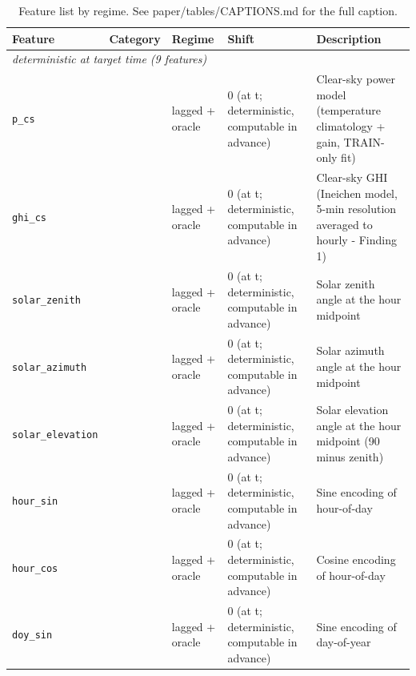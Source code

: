 \begin{table}[t]
  \centering
  \scriptsize
  \caption{Feature list by regime. See paper/tables/CAPTIONS.md for the full caption.}
  \label{tab:features}
  \begin{tabular}{llll p{6.5cm}}
    \toprule
    Feature & Category & Regime & Shift & Description \\
    \midrule
    \multicolumn{5}{l}{\textit{deterministic at target time (9 features)}} \\
    \texttt{p\_cs} &  & lagged + oracle & 0 (at t; deterministic, computable in advance) & Clear-sky power model (temperature climatology + gain, TRAIN-only fit) \\
    \texttt{ghi\_cs} &  & lagged + oracle & 0 (at t; deterministic, computable in advance) & Clear-sky GHI (Ineichen model, 5-min resolution averaged to hourly - Finding 1) \\
    \texttt{solar\_zenith} &  & lagged + oracle & 0 (at t; deterministic, computable in advance) & Solar zenith angle at the hour midpoint \\
    \texttt{solar\_azimuth} &  & lagged + oracle & 0 (at t; deterministic, computable in advance) & Solar azimuth angle at the hour midpoint \\
    \texttt{solar\_elevation} &  & lagged + oracle & 0 (at t; deterministic, computable in advance) & Solar elevation angle at the hour midpoint (90 minus zenith) \\
    \texttt{hour\_sin} &  & lagged + oracle & 0 (at t; deterministic, computable in advance) & Sine encoding of hour-of-day \\
    \texttt{hour\_cos} &  & lagged + oracle & 0 (at t; deterministic, computable in advance) & Cosine encoding of hour-of-day \\
    \texttt{doy\_sin} &  & lagged + oracle & 0 (at t; deterministic, computable in advance) & Sine encoding of day-of-year \\

\end{tabular}
\end{table}
